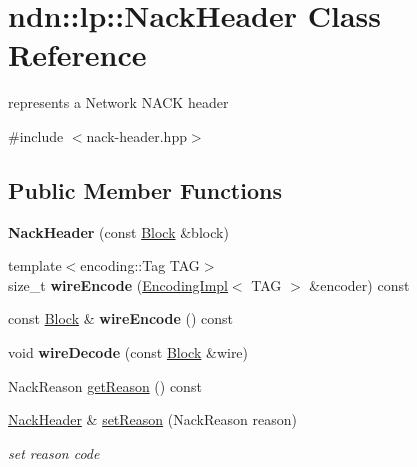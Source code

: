 \hypertarget{classndn_1_1lp_1_1NackHeader}{}\section{ndn\+:\+:lp\+:\+:Nack\+Header Class Reference}
\label{classndn_1_1lp_1_1NackHeader}


represents a Network N\+A\+CK header  




{\ttfamily \#include $<$nack-\/header.\+hpp$>$}

\subsection*{Public Member Functions}
\begin{DoxyCompactItemize}
\item 
{\bfseries Nack\+Header} (const \hyperlink{classndn_1_1Block}{Block} \&block)\hypertarget{classndn_1_1lp_1_1NackHeader_a07fb7874c11b0f5578889f4f39cb3f2b}{}\label{classndn_1_1lp_1_1NackHeader_a07fb7874c11b0f5578889f4f39cb3f2b}

\item 
{\footnotesize template$<$encoding\+::\+Tag T\+AG$>$ }\\size\+\_\+t {\bfseries wire\+Encode} (\hyperlink{classndn_1_1encoding_1_1EncodingImpl}{Encoding\+Impl}$<$ T\+AG $>$ \&encoder) const\hypertarget{classndn_1_1lp_1_1NackHeader_a02a8ae95a03b6d13f7b93ddb473b80b5}{}\label{classndn_1_1lp_1_1NackHeader_a02a8ae95a03b6d13f7b93ddb473b80b5}

\item 
const \hyperlink{classndn_1_1Block}{Block} \& {\bfseries wire\+Encode} () const\hypertarget{classndn_1_1lp_1_1NackHeader_a127d2a7bf43d311befdbb0f3b8e58475}{}\label{classndn_1_1lp_1_1NackHeader_a127d2a7bf43d311befdbb0f3b8e58475}

\item 
void {\bfseries wire\+Decode} (const \hyperlink{classndn_1_1Block}{Block} \&wire)\hypertarget{classndn_1_1lp_1_1NackHeader_ad039ddeb6890180a52d4fee1a6558922}{}\label{classndn_1_1lp_1_1NackHeader_ad039ddeb6890180a52d4fee1a6558922}

\item 
Nack\+Reason \hyperlink{classndn_1_1lp_1_1NackHeader_a551d35d5d63cffb46f1d96487b045960}{get\+Reason} () const
\item 
\hyperlink{classndn_1_1lp_1_1NackHeader}{Nack\+Header} \& \hyperlink{classndn_1_1lp_1_1NackHeader_a2030cdeb3eaa619d533a259f45fd84d2}{set\+Reason} (Nack\+Reason reason)
\begin{DoxyCompactList}\small\item\em set reason code \end{DoxyCompactList}\end{DoxyCompactItemize}


